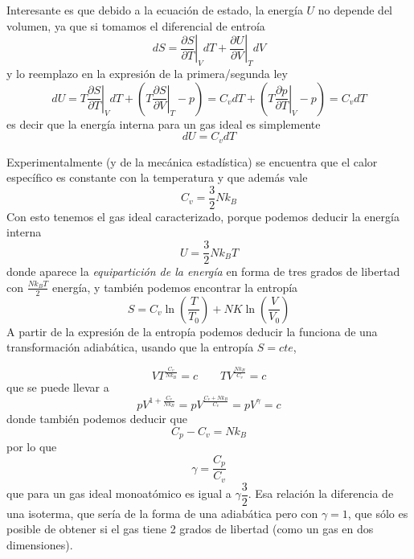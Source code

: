 Interesante es que debido a la ecuación de estado, la energía $U$ no depende del volumen, ya que si tomamos el diferencial de entroía 
\[  dS = \left.\frac{\partial S}{\partial T}\right|_V dT + \left.\frac{\partial U}{\partial V}\right|_T dV\]
y lo reemplazo en la expresión de la primera/segunda ley
\[ dU = T \left.\frac{\partial S}{\partial T}\right|_V dT + \left( T \left.\frac{\partial S}{\partial V}\right|_T - p \right) = C_v dT + \left( T \left.\frac{\partial p}{\partial T}\right|_V - p \right) = C_v dT \]
es decir que la energía interna para un gas ideal es simplemente
\begin{equation}
    dU = C_v dT
    \label{eq:gas_ideal_energia}
\end{equation}

Experimentalmente (y de la mecánica estadística) se encuentra que el calor específico es constante con la temperatura y que además vale
\begin{equation}
    C_v = \frac{3}{2} N k_B
    \label{eq:gas_ideal_cv}
\end{equation}
Con esto tenemos el gas ideal caracterizado, porque podemos deducir la energía interna
\begin{equation}
    U = \frac{3}{2} N k_B T
\end{equation}
donde aparece la \emph{equipartición de la energía} en forma de tres grados de libertad con $\frac{N k_B T}{2}$ energía, y también podemos encontrar la entropía
\begin{equation}
    S = C_v \ln\left(\frac{T}{T_0}\right) + N K \ln\left(\frac{V}{V_0}\right)
\end{equation}
A partir de la expresión de la entropía podemos deducir la funciona de una transformación adiabática, usando que la entropía $S = cte$,

\begin{equation}
    V T^{\frac{C_v}{N k_B}} = c \qquad T V^{\frac{N k_B}{C_v}} = c
\end{equation}
que se puede llevar a
\begin{equation}
    p V^{1 + \frac{C_v}{N k_B}} = p V^{\frac{C_v + N k_B}{C_v}} = p V^{\gamma} = c
\end{equation}
donde también podemos deducir que
\begin{equation}
    C_p - C_v = N k_B
\end{equation}
por lo que 
\begin{equation}
    \gamma = \frac{C_p}{C_v}
\end{equation}
que para un gas ideal monoatómico es igual a $\gamma \dfrac{3}{2}$.
Esa relación la diferencia de una isoterma, que sería de la forma de una adiabática pero con $\gamma = 1$, que sólo es posible de obtener si el gas tiene 2 grados de libertad (como un gas en dos dimensiones).

